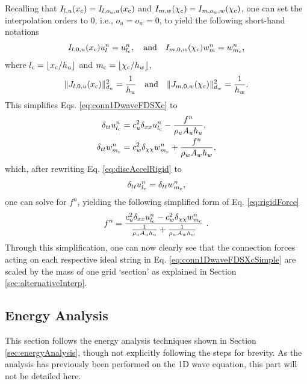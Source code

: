 Recalling that $I_{l, u}(x_{\text{c}}) = I_{l, o_u, u}(x_{\text{c}})$ and $I_{m, w}(\chi_{\text{c}}) = I_{m, o_w, w}(\chi_{\text{c}})$, one can set the interpolation orders to 0, i.e., $o_u = o_w = 0$, to yield the following short-hand notations
\begin{equation}\label{eq:shorthandI}
    I_{l,0,u}(x_\text{c})u_l^n = u_{l_{\text{c}}}^n, \quad \text{and} \quad I_{m,0,w}(\chi_\text{c})w_m^n = w_{m_{\text{c}}}^n,
\end{equation}
where $l_\ctxt = \floor[x_\ctxt/h_u]$ and $m_\ctxt = \floor[\chi_\ctxt/h_w]$,
\begin{equation}\label{eq:shorthandJ}
    \lVert J_{l, 0, u}(x_\text{c})\rVert_{d_u}^2 = \frac{1}{h_u} \quad \text{and} \quad \lVert J_{m, 0, w}(\chi_\text{c})\rVert_{d_w}^2 = \frac{1}{h_w}.
\end{equation}
This simplifies Eqs. \eqref{eq:conn1DwaveFDSXc} to
\begin{subequations}\label{eq:conn1DwaveFDSXcSimple}
    \begin{align}
        \delta_{tt} u_{l_{\text{c}}}^n &= c_u^2 \delta_{xx} u_{l_{\text{c}}}^n -\frac{f^n}{\rho_u A_u h_u}, \label{eq:conn1DwaveuXcSimple} \\
        \delta_{tt} w_{m_{\text{c}}}^n &= c_w^2 \delta_{\chi\chi} w_{m_{\text{c}}}^n + \frac{f^n}{\rho_w A_w h_w},\label{eq:conn1DwavewXcSimple}
    \end{align}
\end{subequations}
which, after rewriting Eq. \eqref{eq:discAccelRigid} to
\begin{equation}
    \delta_{tt}u_{l_{\text{c}}}^n = \delta_{tt}w_{m_{\text{c}}}^n,
\end{equation}
one can solve for $f^n$, yielding the following  simplified form of Eq. \eqref{eq:rigidForce}
\begin{equation}
    f^n = \frac{c_u^2 \delta_{xx} u_{l_{\text{c}}}^n - c_w^2 \delta_{\chi\chi} w_{m_{\text{c}}}^n}{\frac{1}{\rho_u A_u h_u} + \frac{1}{\rho_w A_w h_w}}\ .
\end{equation}
Through this simplification, one can now clearly see that the connection forces acting on each respective ideal string in Eq. \eqref{eq:conn1DwaveFDSXcSimple} are scaled by the mass of one grid `section'  as explained in Section \ref{sec:alternativeInterp}.

\subsection{Energy Analysis}\label{sec:energyAnalysis1DwaveConnRigid}
This section follows the energy analysis techniques shown in Section \ref{sec:energyAnalysis}, though not explicitly following the steps for brevity. As the analysis has previously been performed on the 1D wave equation, this part will not be detailed here. 

